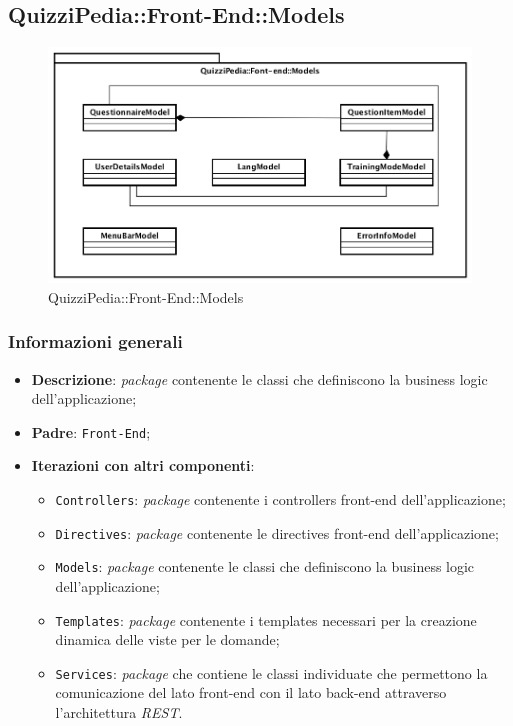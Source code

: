 \newpage

\subsection{QuizziPedia::Front-End::Models}

	\label{QuizziPedia::Front-End::Models}
	
	\begin{figure}[ht]
		\centering
		\includegraphics[scale=0.5,keepaspectratio]{UML/Package/QuizziPedia_Front-End_Models.png}
		\caption{QuizziPedia::Front-End::Models}
	\end{figure} \FloatBarrier

	\subsubsection{Informazioni generali}
		\begin{itemize}
			\item \textbf{Descrizione}: \textit{package} contenente le classi che definiscono la business logic dell'applicazione;
			\item \textbf{Padre}: \texttt{Front-End};
			\item \textbf{Iterazioni con altri componenti}: 
				\begin{itemize}				
					\item \texttt{Controllers}: \textit{package} contenente i controllers front-end dell'applicazione;
					\item \texttt{Directives}: \textit{package} contenente le directives front-end dell'applicazione;
					\item \texttt{Models}: \textit{package} contenente le classi che definiscono la business logic dell'applicazione;
					\item \texttt{Templates}: \textit{package} contenente i templates necessari per la creazione dinamica delle viste per le domande;
					\item \texttt{Services}: \textit{package} che contiene le classi individuate che permettono la comunicazione del lato front-end con il lato back-end attraverso l'architettura \textit{REST}.
				\end{itemize}

		\end{itemize}
	
